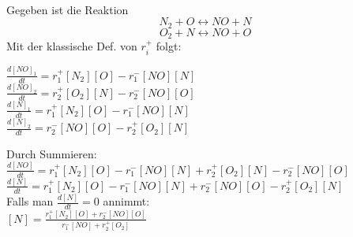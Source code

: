 \documentclass[10pt,a4paper]{scrartcl}
\begin{document}
\begin{multicols*}{3}
\begin{minipage}{0.5\columnwidth}
           \end{minipage} \\
Gegeben ist die Reaktion 
\begin{equation} N_2+O \leftrightarrow NO+N \end{equation}
\begin{equation} O_2+N \leftrightarrow NO+O \end{equation}
Mit der klassische Def. von $r_i^+$ folgt: \\
\begin{minipage}{0.4\columnwidth}
$\frac{d[NO]_1}{dt}=r_1^+[N_2][O]-r_1^-[NO][N]$\\
$\frac{d[NO]_2}{dt}=r_2^+[O_2][N]-r_2^-[NO][O]$\\
$\frac{d[N]_1}{dt}=r_1^+[N_2][O]-r_1^-[NO][N]$\\
$\frac{d[N]_2}{dt}=r_2^-[NO][O]-r_2^+[O_2][N]$\\
\end{minipage}
\begin{minipage}{0.6\columnwidth}
Durch Summieren:\\
$\frac{d[NO]}{dt}=r_1^+[N_2][O]-r_1^-[NO][N]+r_2^+[O_2][N]-r_2^-[NO][O]$\\
$\frac{d[N]}{dt}=r_1^+[N_2][O]-r_1^-[NO][N]+r_2^-[NO][O]-r_2^+[O_2][N]$\\
Falls man $\frac{d[N]}{dt}=0$ annimmt:\\
$[N]=\frac{r_1^+[N_2][O]+r_2^-[NO][O]}{r_1^-[NO]+r_2^+[O_2]}$
\end{minipage}


\end{multicols*}
\end{document}
